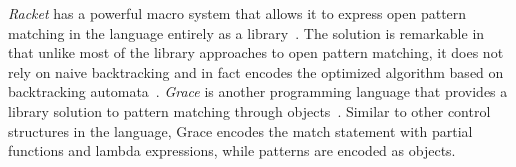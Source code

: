 %
\emph{Racket} has a powerful macro system that allows it to express open pattern 
matching in the language entirely as a library~\cite{Tobin-Hochstadt_2010}. 
The solution is remarkable in that unlike most of the library approaches to open pattern matching, 
it does not rely on naive backtracking and in fact encodes the optimized 
algorithm based on backtracking automata~\cite{Augustsson85,OPM01}. %
%
\emph{Grace} is another programming language that provides a library solution to 
pattern matching through objects~\cite{Grace2012}. Similar to other control 
structures in the language, Grace encodes the match statement with partial 
functions and lambda expressions, while patterns are encoded as objects. 


